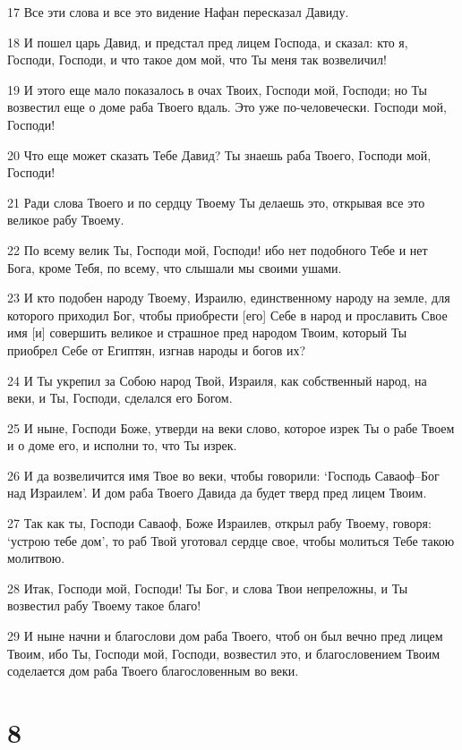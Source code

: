 \par 17 Все эти слова и все это видение Нафан пересказал Давиду.
\par 18 И пошел царь Давид, и предстал пред лицем Господа, и сказал: кто я, Господи, Господи, и что такое дом мой, что Ты меня так возвеличил!
\par 19 И этого еще мало показалось в очах Твоих, Господи мой, Господи; но Ты возвестил еще о доме раба Твоего вдаль. Это уже по-человечески. Господи мой, Господи!
\par 20 Что еще может сказать Тебе Давид? Ты знаешь раба Твоего, Господи мой, Господи!
\par 21 Ради слова Твоего и по сердцу Твоему Ты делаешь это, открывая все это великое рабу Твоему.
\par 22 По всему велик Ты, Господи мой, Господи! ибо нет подобного Тебе и нет Бога, кроме Тебя, по всему, что слышали мы своими ушами.
\par 23 И кто подобен народу Твоему, Израилю, единственному народу на земле, для которого приходил Бог, чтобы приобрести [его] Себе в народ и прославить Свое имя [и] совершить великое и страшное пред народом Твоим, который Ты приобрел Себе от Египтян, изгнав народы и богов их?
\par 24 И Ты укрепил за Собою народ Твой, Израиля, как собственный народ, на веки, и Ты, Господи, сделался его Богом.
\par 25 И ныне, Господи Боже, утверди на веки слово, которое изрек Ты о рабе Твоем и о доме его, и исполни то, что Ты изрек.
\par 26 И да возвеличится имя Твое во веки, чтобы говорили: `Господь Саваоф--Бог над Израилем'. И дом раба Твоего Давида да будет тверд пред лицем Твоим.
\par 27 Так как ты, Господи Саваоф, Боже Израилев, открыл рабу Твоему, говоря: `устрою тебе дом', то раб Твой уготовал сердце свое, чтобы молиться Тебе такою молитвою.
\par 28 Итак, Господи мой, Господи! Ты Бог, и слова Твои непреложны, и Ты возвестил рабу Твоему такое благо!
\par 29 И ныне начни и благослови дом раба Твоего, чтоб он был вечно пред лицем Твоим, ибо Ты, Господи мой, Господи, возвестил это, и благословением Твоим соделается дом раба Твоего благословенным во веки.

\chapter{8}

